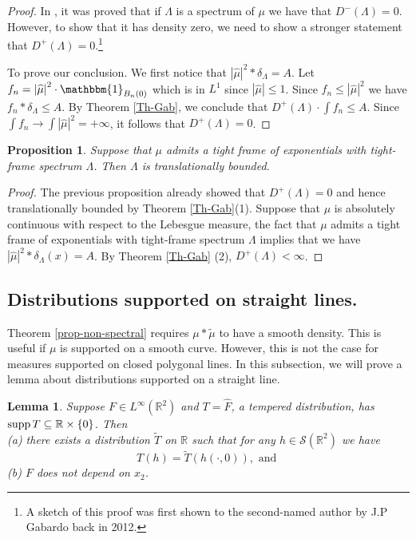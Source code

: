 \documentclass[12pt,a4paper,oneside]{amsart}
\newtheorem{lemma}{Lemma}
\newtheorem{proposition}{Proposition}
\theoremstyle{definition}
\newcommand{\Abs}[1]{{\left|{#1}\right|}}
\newcommand{\Set}[1]{{\left\{{#1}\right\}}}
\newcommand{\RR}{{\mathbb R}}
\newcommand{\one}{{\mathbbm{1}}}
\newcommand{\supp}{{\rm supp\,}}
\newcommand{\ft}[1]{\widehat{#1}}
\newcommand{\wt}[1]{\widetilde{#1}}
\newcounter{rem}
\begin{document}
    \begin{proof}
        In \cite{HLL2013}, it was proved that if $\Lambda$ is a spectrum of $\mu$ we have that $D^-(\Lambda) = 0$. However, to show that it has density zero, we need to  show a stronger statement that $D^{+}(\Lambda) = 0$.\footnote{A sketch of this proof was first shown to the second-named author by J.P Gabardo back in 2012.}

To prove our conclusion. We first notice that $\Abs{\ft\mu}^2*\delta_\Lambda = A$. Let $f_n = \Abs{\ft\mu}^2 \cdot \one_{B_n(0)}$ which is in $L^1$ since $\Abs{\ft\mu} \le 1$. Since $f_n \le \Abs{\ft\mu}^2$ we have $f_n*\delta_\Lambda \le A$. By Theorem \ref{Th-Gab}, we conclude that $D^+(\Lambda) \cdot \int f_n \le A$. Since $\int f_n \to \int \Abs{\ft\mu}^2 = +\infty$, it follows that $D^+(\Lambda)=0$.
 \end{proof}


\begin{proposition}
    Suppose that $\mu$ admits a tight frame of exponentials with tight-frame spectrum $\Lambda$. Then $\Lambda$ is translationally bounded.
\end{proposition}

\begin{proof}
    The previous proposition already showed that $D^{+}(\Lambda) =0$ and hence translationally bounded by Theorem \ref{Th-Gab}(1). Suppose  that $\mu$ is absolutely continuous with respect to the Lebesgue measure, the fact that $\mu$ admits a tight frame of exponentials with tight-frame spectrum $\Lambda$ implies that we have $|\ft\mu|^2\ast \delta_{\Lambda} (x) = A$. By Theorem \ref{Th-Gab} (2), $D^{+}(\Lambda)<\infty$. 
\end{proof}






\subsection{Distributions supported on straight lines.}\label{subsection-line-distribution} Theorem \ref{prop-non-spectral} requires $\mu\ast\wt{\mu}$ to have a smooth density. This is useful if $\mu$ is supported on a smooth curve. However, this is not the case for measures supported on closed polygonal lines. In this subsection, we will prove a lemma about distributions supported on a straight line. 


\begin{lemma}\label{lm:no-transverse-derivatives}
Suppose $F \in L^\infty(\RR^2)$ and $T = \ft F$, a tempered distribution, has $\supp T \subseteq \RR\times\Set{0}$.
Then\\
(a) there exists a distribution $\wt T$ on $\RR$ such that for any $h \in \mathcal{S}(\RR^2)$ we have
$$
T(h) = \wt T(h(\cdot, 0)), \text{ and }
$$
(b) $F$ does not depend on $x_2$.
\end{lemma}
\end{document}
